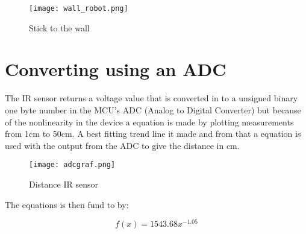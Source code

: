   \begin{figure}[!h!]
	\centering
	\texttt{[image: wall\_robot.png]}
	\caption{Stick to the wall}
	\label{fig:3}
\end{figure}

\newpage
\section{Converting using an ADC}
The IR sensor returns a voltage value that is converted in to a unsigned binary one byte number in the MCU's ADC (Analog to Digital Converter) but because of the nonlinearity in the device a equation is made by plotting measurements from 1cm to 50cm. A best fitting trend line it made and from that a equation is used with the output from the ADC to give the distance in cm.
  \begin{figure}[!h]
	\centering
	\texttt{[image: adcgraf.png]}
	\caption{Distance IR sensor}
	\label{fig:3}
\end{figure}

The equations is then fund to by:

\begin{equation}
f(x) = 1543.68
  x^{-1.05}
\end{equation}


      





